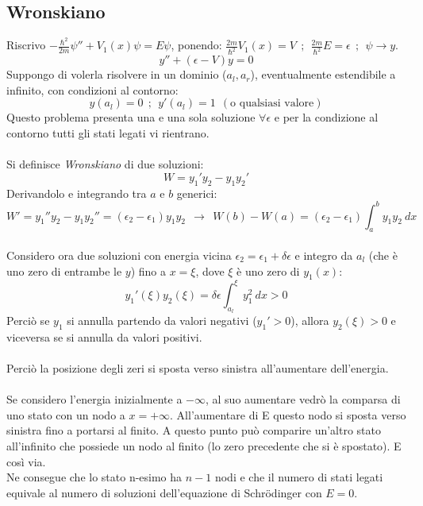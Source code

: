 \documentclass[twoside]{article}
\begin{document}
\vspace{0.5cm}

\subsection{Wronskiano}

Riscrivo $-\frac{\hbar ^2}{2m}\psi'' + V_1(x)\psi=E\psi $, ponendo: $\frac{2m}{\hbar ^2}V_1(x)=V \ \ ; \ \ \frac{2m}{\hbar ^2}E=\epsilon \ \ ; \ \ \psi \rightarrow y$.
\begin{equation}
    y''+(\epsilon - V)y=0
\end{equation}
Suppongo di volerla risolvere in un dominio ($a_l,a_r$), eventualmente estendibile a infinito, con condizioni al contorno:
\begin{equation}
    y(a_l)=0 \ \ ; \ \ y'(a_l)= 1 \ \  (\text{o qualsiasi valore})
\end{equation}
Questo problema presenta una e una sola soluzione $\forall \epsilon$ e per la condizione al contorno tutti gli stati legati vi rientrano.
\\
\\
Si definisce \textit{Wronskiano} di due soluzioni:
\begin{equation}
    W=y_1 ' y_2 - y_1 y_2 '
\end{equation}
Derivandolo e integrando tra $a$ e $b$ generici:
\begin{equation}
    W'=y_1 '' y_2 - y_1 y_2 ''=(\epsilon_2 - \epsilon_1)y_1 y_2 \ \ \rightarrow \ \ W(b)-W(a)=(\epsilon_2 - \epsilon_1)\int_{a}^{b}y_1 y_2 \ dx
\end{equation}
\\
Considero ora due soluzioni con energia vicina $\epsilon_2=\epsilon_1 + \delta \epsilon$ e integro da $a_l$ (che è uno zero di entrambe le $y$) fino a $x=\xi$, dove $\xi$ è uno zero di $y_1 (x)$:
\begin{equation}
    y_1 ' (\xi) y_2 (\xi) = \delta \epsilon \int_{a_l}^{\xi}y_1 ^2 \ dx > 0
\end{equation}
Perciò se $y_1$ si annulla partendo da valori negativi ($y_1 ' > 0$), allora $y_2 (\xi) > 0$ e viceversa se si annulla da valori positivi.
\\ \\
Perciò la posizione degli zeri si sposta verso sinistra all'aumentare dell'energia. 
\\
\\
Se considero l'energia inizialmente a $-\infty$, al suo aumentare vedrò la comparsa di uno stato con un nodo a $x=+\infty$. All'aumentare di E questo nodo si sposta verso sinistra fino a portarsi al finito. A questo punto può comparire un'altro stato all'infinito che possiede un nodo al finito (lo zero precedente che si è spostato). E così via.
\\
Ne consegue che lo stato n-esimo ha $n-1$ nodi e che il numero di stati legati equivale al numero di soluzioni dell'equazione di Schr\"odinger con $E=0$.
\end{document}
